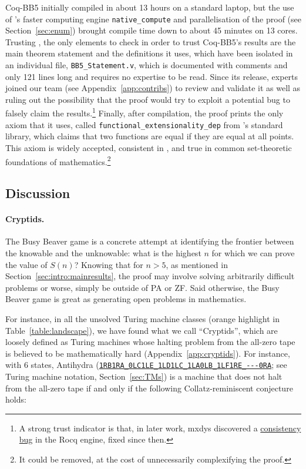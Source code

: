 \documentclass[a4paper,british]{article}
\theoremstyle{definition} %
\numberwithin{equation}{section}
\theoremstyle{definition} %
\newcommand{\tm}[1]{\href{https://bbchallenge.org/#1}{\texttt{\nolinkurl{#1}}}}
\newcommand{\CoqBB}{Coq-BB5\xspace}
\begin{document}
\CoqBB initially compiled in about 13 hours on a standard laptop, but the use of \Coq's faster computing engine \texttt{native\_compute} \cite{nativecompute} and parallelisation of the proof (see Section~\ref{sec:enum}) brought compile time down to about 45 minutes on 13 cores. Trusting \Coq, the only elements to check in order to trust \CoqBB's results are the main theorem statement and the definitions it uses, which have been isolated in an individual file, \texttt{BB5\_Statement.v}, which is documented with comments and only 121 lines long and requires no \Coq expertise to be read. Since its release, \Coq experts joined our team (see Appendix~\ref{app:contribs}) to review and validate it as well as ruling out the possibility that the proof would try to exploit a potential \Coq bug to falsely claim the results.\footnote{A strong trust indicator is that, in later work, mxdys discovered a \href{https://github.com/rocq-prover/rocq/issues/20413}{consistency bug} in the Rocq engine, fixed since then.} Finally, after compilation, the proof prints the only axiom that it uses, called \texttt{functional\_extensionality\_dep} from \Coq's standard library, which claims that two functions are equal if they are equal at all points. This axiom is widely accepted, consistent in \Coq, and true in common set-theoretic foundations of mathematics.\footnote{It could be removed, at the cost of unnecessarily complexifying the proof.}


\subsection{Discussion}\label{sec:intro:discuss}

\paragraph{Cryptids.} The Busy Beaver game is a concrete attempt at identifying the frontier between the knowable and the unknowable: what is the highest $n$ for which we can prove the value of $S(n)$? Knowing that for $n > 5$, as mentioned in Section~\ref{sec:intro:mainresults}, the proof may involve solving arbitrarily difficult problems or worse, simply be outside of PA or ZF. Said otherwise, the Busy Beaver game is great as generating open problems in mathematics.


For instance, in all the unsolved Turing machine classes (orange highlight in Table~\ref{table:landscape}), we have found what we call ``Cryptids'', which are loosely defined as Turing machines whose halting problem from the all-zero tape is believed to be mathematically hard (Appendix~\ref{app:cryptids}). For instance, with 6 states, Antihydra (\tm{1RB1RA_0LC1LE_1LD1LC_1LA0LB_1LF1RE_---0RA}; see Turing machine notation, Section~\ref{sec:TMs}) is a machine that does not halt from the all-zero tape if and only if the following Collatz-reminiscent conjecture holds:
\end{document}
